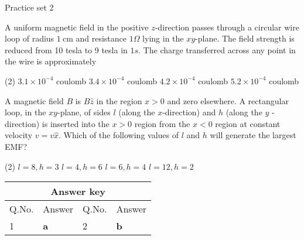 \newpage
\begin{abox}
	Practice set 2
	\end{abox}
\begin{enumerate}
\begin{minipage}{\textwidth}
	\item A uniform magnetic field in the positive $z$-direction passes through a circular wire loop of radius $1 \mathrm{~cm}$ and resistance $1 \Omega$ lying in the $x y$-plane. The field strength is reduced from 10 tesla to 9 tesla in $1 s$. The charge transferred across any point in the wire is approximately
\end{minipage}
\begin{tasks}(2)
	\task[\textbf{A.}]$3.1 \times 10^{-4}$ coulomb
	\task[\textbf{B.}] $3.4 \times 10^{-4}$ coulomb
	\task[\textbf{C.}] $4.2 \times 10^{-4}$ coulomb
	\task[\textbf{D.}]$5.2 \times 10^{-4}$ coulomb
\end{tasks}
\begin{minipage}{\textwidth}
	\item A magnetic field $B$ is $B \hat{z}$ in the region $x>0$ and zero elsewhere. A rectangular loop, in the $x y$-plane, of sides $l$ (along the $x$-direction) and $h$ (along the $y$ - direction) is inserted into the $x>0$ region from the $x<0$ region at constant velocity $v=v \hat{x}$. Which of the following values of $l$ and $h$ will generate the largest EMF?
\end{minipage}
\begin{tasks}(2)
	\task[\textbf{A.}] $l=8, h=3$
	\task[\textbf{B.}]$l=4, h=6$
	\task[\textbf{C.}]$l=6, h=4$
	\task[\textbf{D.}]$l=12, h=2$
\end{tasks}
\end{enumerate}

\setlength\arrayrulewidth{1pt}
\begin{table}[H]
	\centering
	
	\begin{tabular}{|p{1.5cm}|p{1.5cm}||p{1.5cm}|p{1.5cm}|}
		\hline
		\multicolumn{4}{|c|}{\textbf{Answer key}}\\\hline\hline
		\rowcolor{ocrel}Q.No.&Answer&Q.No.&Answer\\\hline
		1&\textbf{a}&2&\textbf{b}\\\hline
	\end{tabular}
\end{table}



































